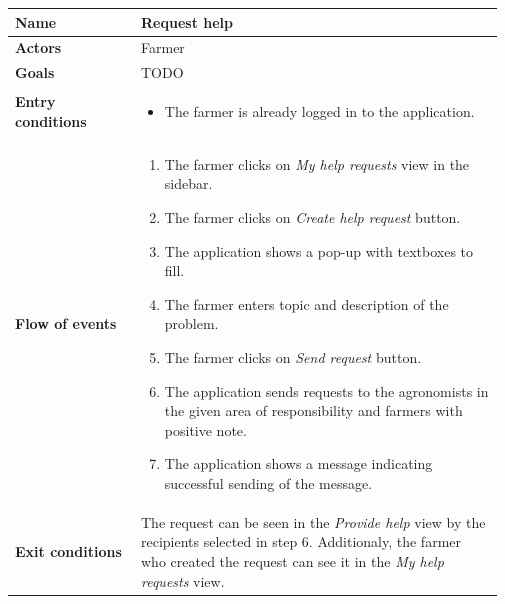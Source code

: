 \begin{table}[H]
    \centering
	\begin{tabular}{@{}p{0.25\linewidth} p{0.72\linewidth}@{}}
\toprule
		\textbf{Name}               & Request help\\
		\midrule
		\textbf{Actors}             & Farmer\\
		\midrule
		\textbf{Goals}              & TODO \\
		\midrule
		
		\textbf{Entry conditions}   & \begin{itemize}[leftmargin=.4cm,noitemsep,topsep=0pt,before=\vspace{-3mm},after=\vspace{-4mm}]
		    \item The farmer is already logged in to the application.
		\end{itemize}\\
		\midrule
		
		\textbf{Flow of events}     & \begin{enumerate}[leftmargin=.4cm,noitemsep,topsep=0pt,before=\vspace{-3mm},after=\vspace{-4mm}]
		    \item The farmer clicks on \textit{My help requests} view in the sidebar.
		    \item The farmer clicks on \textit{Create help request} button.
		    \item The application shows a pop-up with textboxes to fill.
		    \item The farmer enters topic and description of the problem.
		    \item The farmer clicks on \textit{Send request} button.
		    \item The application sends requests to the agronomists in the given area of responsibility and farmers with positive note. 
		    \item The application shows a message indicating successful sending of the message.
		\end{enumerate}\\
		\midrule
		\textbf{Exit conditions}    & The request can be seen in the \textit{Provide help} view by the recipients selected in step 6. Additionaly, the farmer who created the request can see it in the \textit{My help requests} view. \\
		\midrule
		

\end{tabular}
\end{table}
